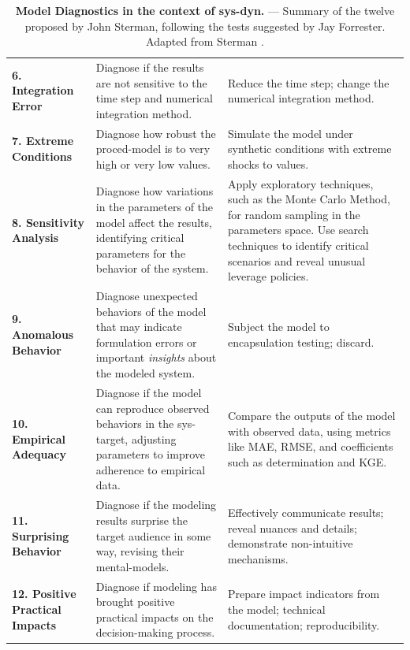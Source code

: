 \documentclass[./main_en.tex]{subfiles}
\begin{document}
{\begin{table}[t!]
\begin{tabular}{ 
 >{\raggedright\arraybackslash}m{2.75cm}  
 >{\raggedright\arraybackslash}m{5cm}  
 >{\raggedright\arraybackslash}m{5cm}}
        \textbf{6. Integration Error} & Diagnose if the results are not sensitive to the time step and numerical integration method.& Reduce the time step; change the numerical integration method.\\        
        
        \textbf{7. Extreme Conditions} & Diagnose how robust the \gls{proced-model} is to very high or very low values.& Simulate the \gls{model} under synthetic conditions with extreme shocks to values.\\

        \textbf{8. Sensitivity Analysis} & Diagnose how variations in the \gls{parameters} of the \gls{model} affect the results, identifying critical \gls{parameters} for the behavior of the \gls{system}. & Apply exploratory techniques, such as the Monte Carlo Method, for random sampling in the \gls{parameters} space. Use search techniques to identify critical scenarios and reveal unusual leverage policies.\\
        
        \textbf{9. Anomalous Behavior} & Diagnose unexpected behaviors of the \gls{model} that may indicate formulation errors or important \textit{insights} about the modeled \gls{system}. & Subject the \gls{model} to encapsulation testing; discard.\\
        
        \textbf{10. Empirical Adequacy} & Diagnose if the \gls{model} can reproduce observed behaviors in the \gls{sys-target}, adjusting \gls{parameters} to improve adherence to empirical data. & Compare the outputs of the \gls{model} with observed data, using metrics like MAE, RMSE, and coefficients such as determination and KGE.\\
        
        \textbf{11. Surprising Behavior} & Diagnose if the modeling results surprise the target audience in some way, revising their \gls{mental-models}.& 
        Effectively communicate results; reveal nuances and details; demonstrate non-intuitive mechanisms.\\  
        
        \textbf{12. Positive Practical Impacts} & Diagnose if modeling has brought positive practical impacts on the decision-making process.& Prepare impact indicators from the \gls{model}; technical documentation; reproducibility.\\  
        \bottomrule
    \end{tabular}
    \caption[Model Diagnostics.]{
    \textbf{Model Diagnostics in the context of \gls{sys-dyn}.}\; --- \;Summary of the twelve  proposed by John Sterman, following the tests suggested by Jay Forrester. Adapted from Sterman \cite{sterman2000}.
    }
    \label{tbl:tests}
\end{table}
}
\end{document}
